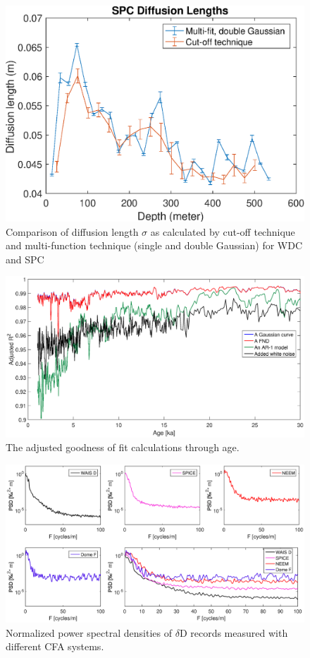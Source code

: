\documentclass[draft, jgrga]{AGUTeX}
\begin{document}
\begin{figure}
\includegraphics[width=.9\linewidth]{sigma_comp.eps}
\caption{Comparison of diffusion length $\sigma$ as calculated by cut-off technique and multi-function technique (single and double Gaussian) for WDC and SPC}\label{sigma_comp}
\end{figure}

\begin{figure}
	\includegraphics[width=.9\linewidth]{G_of_fit_1.eps}
	\caption{The adjusted goodness of fit calculations through age. } \label{G_of_fit_1}
\end{figure}

\begin{figure}
	\includegraphics[width=.9\linewidth]{CFA_spectra.eps}
	\caption{Normalized power spectral densities of $\delta$D records measured with different CFA systems. } \label{CFA_spectra}
\end{figure}
\end{document}
